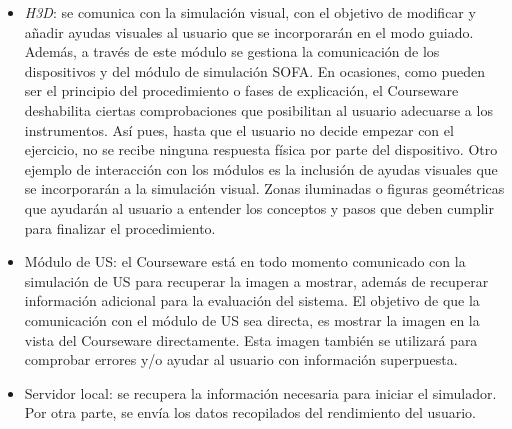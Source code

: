 \begin{itemize}
    
    \item \emph{H3D}: se comunica con la simulación visual, con el objetivo de modificar y añadir ayudas visuales al usuario que se incorporarán en el modo guiado. Además, a través de este módulo se gestiona la comunicación de los dispositivos y del módulo de simulación \acs{SOFA}. En ocasiones, como pueden ser el principio del procedimiento o fases de explicación, el \ac{Courseware} deshabilita ciertas comprobaciones que posibilitan al usuario adecuarse a los instrumentos. Así pues, hasta que el usuario no decide empezar con el ejercicio, no se recibe ninguna respuesta física por parte del dispositivo. Otro ejemplo de interacción con los módulos es la inclusión de ayudas visuales que se incorporarán a la simulación visual. Zonas iluminadas o figuras geométricas que ayudarán al usuario a entender los conceptos y pasos que deben cumplir para finalizar el procedimiento. 
    
    \item Módulo de \ac{US}: el \ac{Courseware} está en todo momento comunicado con la simulación de \ac{US} para recuperar la imagen a mostrar, además de recuperar información adicional para la evaluación del sistema. El objetivo de que la comunicación con el módulo de \ac{US} sea directa, es mostrar la imagen en la vista del \ac{Courseware} directamente. Esta imagen también se utilizará para comprobar errores y/o ayudar al usuario con información superpuesta.
    


\item Servidor local: se recupera la información necesaria para iniciar el simulador. Por otra parte, se envía los datos recopilados del rendimiento del usuario.


\end{itemize}




